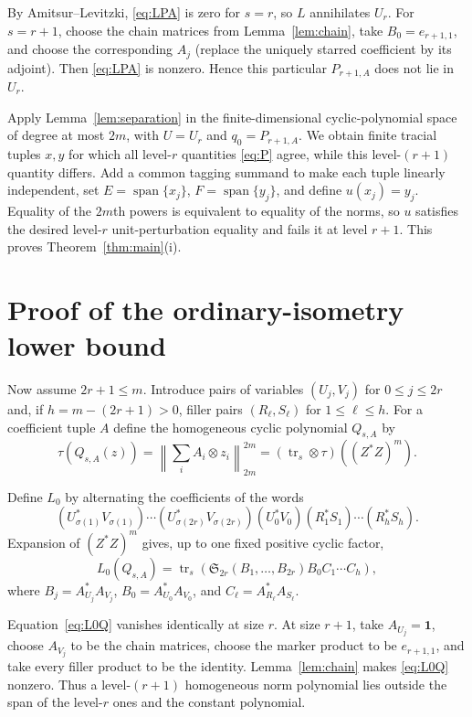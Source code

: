 \documentclass[11pt]{article}
\theoremstyle{remark}
\newcommand{\tr}{\operatorname{tr}}
\newcommand{\Span}{\operatorname{span}}
\newcommand{\one}{\mathbf 1}
\newcommand{\Spol}{\mathfrak S}
\begin{document}
By Amitsur--Levitzki, \eqref{eq:LPA} is zero for $s=r$, so $L$ annihilates
$U_r$.  For $s=r+1$, choose the chain matrices from
Lemma~\ref{lem:chain}, take $B_0=e_{r+1,1}$, and choose the corresponding
$A_j$ (replace the uniquely starred coefficient by its adjoint).  Then
\eqref{eq:LPA} is nonzero.  Hence this particular $P_{r+1,A}$ does not lie
in $U_r$.

Apply Lemma~\ref{lem:separation} in the finite-dimensional cyclic-polynomial
space of degree at most $2m$, with $U=U_r$ and $q_0=P_{r+1,A}$.  We obtain
finite tracial tuples $x,y$ for which all level-$r$ quantities
\eqref{eq:P} agree, while this level-$(r+1)$ quantity differs.  Add a common
tagging summand to make each tuple linearly independent, set
$E=\Span\{x_j\}$, $F=\Span\{y_j\}$, and define $u(x_j)=y_j$.  Equality of
the $2m$th powers is equivalent to equality of the norms, so $u$ satisfies
the desired level-$r$ unit-perturbation equality and fails it at level
$r+1$.  This proves Theorem~\ref{thm:main}(i).

\section{Proof of the ordinary-isometry lower bound}

Now assume $2r+1\le m$.  Introduce pairs of variables
$(U_j,V_j)$ for $0\le j\le2r$ and, if
$h=m-(2r+1)>0$, filler pairs $(R_\ell,S_\ell)$ for $1\le\ell\le h$.
For a coefficient tuple $A$ define the homogeneous cyclic polynomial
$Q_{s,A}$ by
\begin{equation}\label{eq:Q}
 \tau(Q_{s,A}(z))=
 \left\|\sum_i A_i\otimes z_i\right\|_{2m}^{2m}
 = (\tr_s\otimes\tau)((Z^*Z)^m).
\end{equation}

Define $L_0$ by alternating the coefficients of the words
\[
 (U_{\sigma(1)}^*V_{\sigma(1)})\cdots
 (U_{\sigma(2r)}^*V_{\sigma(2r)})
 (U_0^*V_0)(R_1^*S_1)\cdots(R_h^*S_h).
\]
Expansion of $(Z^*Z)^m$ gives, up to one fixed positive cyclic factor,
\begin{equation}\label{eq:L0Q}
 L_0(Q_{s,A})=
 \tr_s\!\left(\Spol_{2r}(B_1,\ldots,B_{2r})B_0C_1\cdots C_h\right),
\end{equation}
where $B_j=A_{U_j}^*A_{V_j}$, $B_0=A_{U_0}^*A_{V_0}$, and
$C_\ell=A_{R_\ell}^*A_{S_\ell}$.

Equation~\eqref{eq:L0Q} vanishes identically at size $r$.  At size $r+1$,
take $A_{U_j}=\one$, choose $A_{V_j}$ to be the chain matrices, choose the
marker product to be $e_{r+1,1}$, and take every filler product to be the
identity.  Lemma~\ref{lem:chain} makes \eqref{eq:L0Q} nonzero.  Thus a
level-$(r+1)$ homogeneous norm polynomial lies outside the span of the
level-$r$ ones and the constant polynomial.
\end{document}

